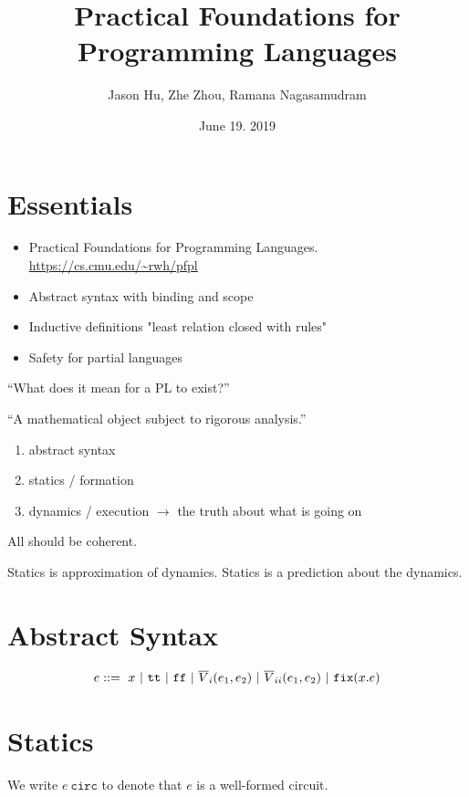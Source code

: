 \documentclass{article}
\title{Practical Foundations for Programming Languages}
\author{Jason Hu, Zhe Zhou, Ramana Nagasamudram}
\date{June 19. 2019}
\newcommand{\Circ}[1]{#1\ \texttt{circ}}
\newcommand{\ttt}{\texttt{tt}}
\newcommand{\ff}{\texttt{ff}}
\newcommand{\fix}[2]{\texttt{fix}(#1 . #2)}
\newcommand{\RNum}[1]{\uppercase\expandafter{\romannumeral #1\relax}}
\newcommand{\nor}[3]{\overline{V}_{\RNum #1}(#2, #3)}
\begin{document}
\maketitle

\section{Essentials}
\begin{itemize}
  \item Practical Foundations for Programming Languages. \url{https://cs.cmu.edu/~rwh/pfpl}
  \item Abstract syntax with binding and scope
  \item Inductive definitions "least relation closed with rules"
  \item Safety for partial languages
\end{itemize}

\begin{displayquote}
``What does it mean for a PL to exist?''

``A mathematical object subject to rigorous analysis.''
\end{displayquote}

\begin{enumerate}
\item abstract syntax
\item statics  / formation
\item dynamics / execution $\to$ the truth about what is going on
\end{enumerate}

All should be coherent.

Statics is approximation of dynamics. Statics is a prediction about the dynamics.

\section{Abstract Syntax}

\begin{align*}
  e ::= \ x\ |\ \ttt\ |\ \ff\ |\ \nor 1{e_1}{e_2}\ |\ \nor 2{e_1}{e_2}\ |\
          \fix{x}{e}
\end{align*}

\section{Statics}

We write $\Circ{e}$ to denote that $e$ is a well-formed circuit.
\end{document}
